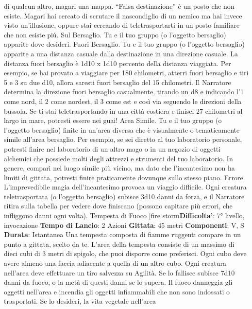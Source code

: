 \begin{multicols}{2}
di qualcun altro, magari una mappa.
“Falsa destinazione” è un posto che non esiste. Magari
hai cercato di scrutare il nascondiglio di un nemico ma
hai invece visto un’illusione, oppure stai cercando di
teletrasportarti in un posto familiare che non esiste più.
Sul Bersaglio. Tu e il tuo gruppo (o l’oggetto bersaglio)
apparite dove desideri.
Fuori Bersaglio. Tu e il tuo gruppo (o l’oggetto
bersaglio) apparite a una distanza casuale dalla
destinazione in una direzione casuale. La distanza fuori
bersaglio è 1d10 x 1d10 percento della distanza
viaggiata. Per esempio, se hai provato a viaggiare per
180 chilometri, atterri fuori bersaglio e tiri 5 e 3 su due
d10, allora saresti fuori bersaglio del 15%
chilometri. Il Narratore determina la direzione fuori bersaglio
casualmente, tirando un d8 e indicando l’1 come nord, il
2 come nordest, il 3 come est e così via seguendo le
direzioni della bussola. Se ti stai teletrasportando in una
città costiera e finisci 27 chilometri al largo in mare,
potresti essere nei guai!
Area Simile. Tu e il tuo gruppo (o l’oggetto bersaglio)
finite in un’area diversa che è visualmente o
tematicamente simile all’area bersaglio. Per esempio,
se sei diretto al tuo laboratorio personale, potresti finire
nel laboratorio di un altro mago o in un negozio di
oggetti alchemici che possiede molti degli attrezzi e
strumenti del tuo laboratorio. In genere, compari nel
luogo simile più vicino, ma dato che l’incantesimo non
ha limiti di gittata, potresti finire praticamente dovunque
sullo stesso piano.
Errore. L’imprevedibile magia dell’incantesimo provoca
un viaggio difficile. Ogni creatura teletrasportata (o
l’oggetto bersaglio) subisce 3d10 danni da forza, e il
Narratore ritira sulla tabella per vedere dove finiscano
(possono capitare più errori, che infliggono danni ogni
volta).
Tempesta di Fuoco
[fire storm\textbf{Difficolta'}:
7° livello, invocazione
\textbf{Tempo di Lancio}: 2 Azioni
\textbf{Gittata}: 45 metri
\textbf{Componenti}: V, S
\textbf{Durata}: Istantanea
Una tempesta composta di fiamme ruggenti compare in
un punto a gittata, scelto da te. L’area della tempesta
consiste di un massimo di dieci cubi di 3 metri di
spigolo, che puoi disporre come preferisci. Ogni cubo
deve avere almeno una faccia adiacente a quella di un
altro cubo. Ogni creatura nell’area deve effettuare un
tiro salvezza su Agilità. Se lo fallisce subisce 7d10
danni da fuoco, o la metà di questi danni se lo supera.
Il fuoco danneggia gli oggetti nell’area e incendia gli
oggetti infiammabili che non sono indossati o
trasportati. Se lo desideri, la vita vegetale nell’area

\end{multicols}
